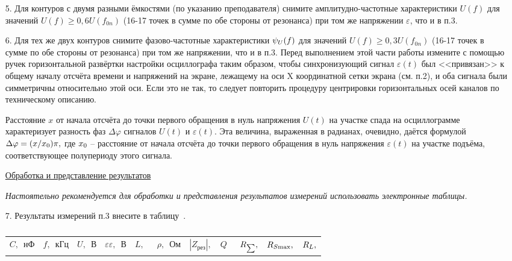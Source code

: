 \begin{lab:task}
\begin{enumerate}
    \item[5.] Для контуров с двумя разными ёмкостями (по указанию преподавателя) снимите амплитудно-частотные характеристики $U(f)$ для значений $U(f)\ge0,6U(f_{0n})$ (16-17 точек в сумме по обе стороны от резонанса) при том же напряжении $\varepsilon$, что и в п.3.

    \item[6.] Для тех же двух контуров снимите фазово-частотные характеристики $\psi_{\sc{U}}(f)$ для значений $U(f)\ge0,3U(f_{0n})$ (16-17 точек в сумме по обе стороны от резонанса) при том же напряжении, что и в п.3. Перед выполнением этой части работы измените с помощью ручек горизонтальной развёртки настройки осциллографа таким образом, чтобы синхронизующий сигнал $\varepsilon(t)$ был <<привязан>> к общему началу отсчёта времени и напряжений на экране, лежащему на оси X координатной сетки экрана (см. п.2), и оба сигнала были симметричны относительно этой оси. Если это не так, то следует повторить процедуру центрировки горизонтальных осей каналов по техническому описанию.

    Расстояние $x$ от начала отсчёта до точки первого обращения в нуль напряжения $U(t)$ на участке спада на осциллограмме характеризует разность фаз $\Delta\varphi$ сигналов $U(t)$ и $\varepsilon(t).$ Эта величина, выраженная в радианах, очевидно, даётся формулой $\Delta\varphi=(x/x_{\sc{0}})\pi,$ где $x_{\sc{0}}$ – расстояние от начала отсчёта до точки первого обращения в нуль напряжения $\varepsilon(t)$ на участке подъёма, соответствующее полупериоду этого сигнала.

\begin{center}
    \underline{Обработка и представление результатов}
\end{center}

\emph{Настоятельно рекомендуется для обработки и представления результатов измерений использовать электронные таблицы.}

\item[7.] Результаты измерений п.3 внесите в таблицу~.
\begin{center}
    \begin{table}[h!]
        \caption{}
        \begin{center}
            \begin{tabular}{|c|c|c|c|c|c|c|c|c|c|c|}
                \hline
                $C,$~нФ& $f,$~кГц& $U,$~В & $\varepsilon\varepsilon,$~В& $L,$~& $\rho,$~Ом& $|Z_{\text{рез}}|,$& $Q$~& $R_{\sc{\sum}},$& $R_{\sc{S}\text{max}},$& $R_{\sc{L}},$\\


\end{tabular}
\end{center}
\end{table}
\end{center}
\end{enumerate}
\end{lab:task}
